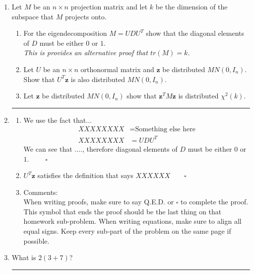 \documentclass[12pt]{article}
\begin{document}
\begin{enumerate}
\item[$\textbf{Problem 1}$]
Let $M$ be an $n\times n$  projection matrix and let $k$ be the dimension of the subspace that $M$ projects onto. 
 
\begin{enumerate}
	\item For  the eigendecomposition $M= U D U^T$   show that the diagonal elements of $D$ must be either $0$ or $1$.\\ {\it \color{pink} This is provides an alternative proof that $tr(M) =k$. }
	\item Let  $U$ be an $n \times n$ orthonormal matrix and $\mathbf{z}$ be distributed $MN(0,I_n)$. Show that $U^T\mathbf{z}$ is also  distributed $MN(0,I_n)$.
	\item Let $\mathbf{z}$ be distributed $MN(0,I_n)$  show that  $\mathbf{z}^T M \mathbf{z} $ is  distributed $\chi^2(k)$.
\end{enumerate}

\noindent\rule{0.9\textwidth}{0.75pt}

\item[Answer:] 
\begin{enumerate}
	\item We use the fact that... 
	\begin{align*}
		XXXXXXXX &= \text{Something else here}  \\
		XXXXXXXX &= UDU^T
	\end{align*}
	We can see that ...., therefore diagonal elements of $D$ must be either $0$ or $1$. $\qquad \square$
	
	\item $U^T \mathbf{z} $ satisfies the definition that says $XXXXXX \qquad \square$
	\item \textcolor{coloradoRed}{Comments: \\ When writing proofs, make sure to say Q.E.D. or $\square$ to complete the proof. This symbol that ends the proof should be the last thing on that homework sub-problem. When writing equations, make sure to align all equal signs. Keep every sub-part of the problem on the same page if possible. }
\end{enumerate}
\clearpage

\item[$\textbf{Problem 2}$] What is $2(3 + 7)$? 

\noindent\rule{0.9\textwidth}{0.75pt}


\end{enumerate}
\end{document}

